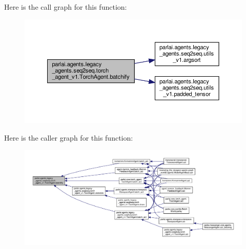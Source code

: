 Here is the call graph for this function\+:
\nopagebreak
\begin{figure}[H]
\begin{center}
\leavevmode
\includegraphics[width=350pt]{classparlai_1_1agents_1_1legacy__agents_1_1seq2seq_1_1torch__agent__v1_1_1TorchAgent_ab8b2fa26aabfd9d7e7abb0abbcfe8044_cgraph}
\end{center}
\end{figure}
Here is the caller graph for this function\+:
\nopagebreak
\begin{figure}[H]
\begin{center}
\leavevmode
\includegraphics[width=350pt]{classparlai_1_1agents_1_1legacy__agents_1_1seq2seq_1_1torch__agent__v1_1_1TorchAgent_ab8b2fa26aabfd9d7e7abb0abbcfe8044_icgraph}
\end{center}
\end{figure}
\mbox{\label{classparlai_1_1agents_1_1legacy__agents_1_1seq2seq_1_1torch__agent__v1_1_1TorchAgent_abc77ad96264e7597c46bc001a9a6af90}} 
